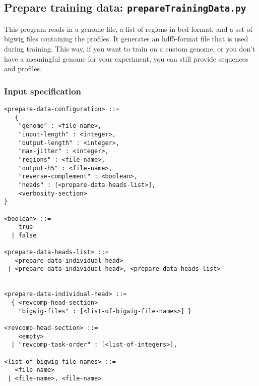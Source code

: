\documentclass{article}
\begin{document}
\newpage
\subsection{Prepare training data: \texttt{prepareTrainingData.py}}

This program reads in a genome file, a list of regions in bed format, and a set of bigwig files containing the profiles. 
It generates an hdf5-format file that is used during training. 
This way, if you want to train on a custom genome, or you don't have a meaningful genome for your experiment, you can still provide sequences and profiles. 

\subsubsection{Input specification}

\begin{lstlisting}
<prepare-data-configuration> ::=
   {
    "genome" : <file-name>,
    "input-length" : <integer>,
    "output-length" : <integer>,
    "max-jitter" : <integer>,
    "regions" : <file-name>,
    "output-h5" : <file-name>,
    "reverse-complement" : <boolean>,
    "heads" : [<prepare-data-heads-list>],
    <verbosity-section>
}

<boolean> ::=
    true
  | false

<prepare-data-heads-list> ::=
   <prepare-data-individual-head>
 | <prepare-data-individual-head>, <prepare-data-heads-list>


<prepare-data-individual-head> ::=
  { <revcomp-head-section>
    "bigwig-files" : [<list-of-bigwig-file-names>] }

<revcomp-head-section> ::= 
    <empty>
  | "revcomp-task-order" : [<list-of-integers>],

<list-of-bigwig-file-names> ::= 
   <file-name>
 | <file-name>, <file-name>

\end{lstlisting}
\end{document}
